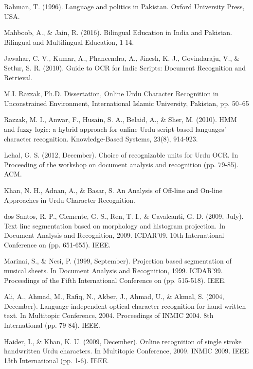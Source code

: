 \documentclass[a4paper,conference]{IEEEtran}
\begin{document}
\begin{thebibliography}{130}

Rahman, T. (1996). Language and politics in Pakistan. Oxford University Press, USA.

Mahboob, A., \& Jain, R. (2016). Bilingual Education in India and Pakistan. Bilingual and Multilingual Education, 1-14.

Jawahar, C. V., Kumar, A., Phaneendra, A., Jinesh, K. J., Govindaraju, V., \& Setlur, S. R. (2010). Guide to OCR for Indic Scripts: Document Recognition and Retrieval.

M.I. Razzak, Ph.D. Dissertation, Online Urdu Character Recognition in Unconstrained Environment, International Islamic University, Pakistan, pp. 50–65

Razzak, M. I., Anwar, F., Husain, S. A., Belaid, A., \& Sher, M. (2010). HMM and fuzzy logic: a hybrid approach for online Urdu script-based languages’ character recognition. Knowledge-Based Systems, 23(8), 914-923. 

Lehal, G. S. (2012, December). Choice of recognizable units for Urdu OCR. In Proceeding of the workshop on document analysis and recognition (pp. 79-85). ACM.

Khan, N. H., Adnan, A., \& Basar, S. An Analysis of Off-line and On-line Approaches in Urdu Character Recognition.

dos Santos, R. P., Clemente, G. S., Ren, T. I., \& Cavalcanti, G. D. (2009, July). Text line segmentation based on morphology and histogram projection. In Document Analysis and Recognition, 2009. ICDAR'09. 10th International Conference on (pp. 651-655). IEEE.

Marinai, S., \& Nesi, P. (1999, September). Projection based segmentation of musical sheets. In Document Analysis and Recognition, 1999. ICDAR'99. Proceedings of the Fifth International Conference on (pp. 515-518). IEEE.

Ali, A., Ahmad, M., Rafiq, N., Akber, J., Ahmad, U., \& Akmal, S. (2004, December). Language independent optical character recognition for hand written text. In Multitopic Conference, 2004. Proceedings of INMIC 2004. 8th International (pp. 79-84). IEEE.

Haider, I., \& Khan, K. U. (2009, December). Online recognition of single stroke handwritten Urdu characters. In Multitopic Conference, 2009. INMIC 2009. IEEE 13th International (pp. 1-6). IEEE.


\end{thebibliography}
\end{document}
